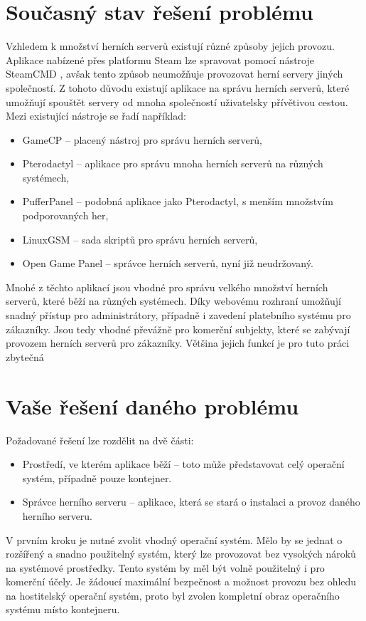\documentclass{article}
\begin{document}
\section{Současný stav řešení problému}
Vzhledem k množství herních serverů existují různé způsoby jejich provozu. Aplikace nabízené přes platformu Steam lze spravovat pomocí nástroje
SteamCMD \cite{steamcmd}, avšak tento způsob neumožňuje provozovat herní servery jiných společností.
Z tohoto důvodu existují aplikace na správu herních serverů, které umožňují spouštět servery od mnoha společností uživatelsky přívětivou cestou.
Mezi existující nástroje se řadí například:
\begin{itemize}
    \item GameCP -- placený nástroj pro správu herních serverů,
    \item Pterodactyl -- aplikace pro správu mnoha herních serverů na různých systémech,
    \item PufferPanel -- podobná aplikace jako Pterodactyl, s menším množstvím podporovaných her,
    \item LinuxGSM -- sada skriptů pro správu herních serverů,
    \item Open Game Panel -- správce herních serverů, nyní již neudržovaný.
\end{itemize}
Mnohé z těchto aplikací jsou vhodné pro správu velkého množství herních serverů, které běží na různých systémech. Díky webovému rozhraní umožňují snadný
přístup pro administrátory, případně i zavedení platebního systému pro zákazníky. Jsou tedy vhodné převážně pro komerční subjekty, které se zabývají
provozem herních serverů pro zákazníky. Většina jejich funkcí je pro tuto práci zbytečná


\section{Vaše řešení daného problému}
Požadované řešení lze rozdělit na dvě části:
\begin{itemize}
    \item Prostředí, ve kterém aplikace běží -- toto může představovat celý operační systém, případně pouze kontejner.
    \item Správce herního serveru -- aplikace, která se stará o instalaci a provoz daného herního serveru.
\end{itemize}
V prvním kroku je nutné zvolit vhodný operační systém. Mělo by se jednat o rozšířený a snadno použitelný systém,
který lze provozovat bez vysokých nároků na systémové prostředky. Tento systém by měl být volně použitelný i pro komerční účely.
Je žádoucí maximální bezpečnost a možnost provozu bez ohledu na hostitelský operační systém, proto byl zvolen kompletní obraz operačního systému
místo kontejneru.
\end{document}
